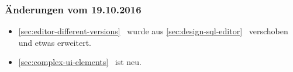 \documentclass[paper=a4,fontsize=12pt,parskip=half,twoside]{scrartcl}
\begin{document}
\subsubsection*{Änderungen vom 19.10.2016}
\begin{itemize}[noitemsep]
\item \ref{sec:editor-different-versions}~ wurde aus \ref{sec:design-sql-editor}~ verschoben und etwas erweitert.
\item \ref{sec:complex-ui-elements}~ ist neu.
\end{itemize}

\newpage
\tableofcontents{}

\cleardoublepage


\cleardoublepage


\cleardoublepage


\cleardoublepage


\cleardoublepage


\cleardoublepage


\appendix{}

\cleardoublepage


\cleardoublepage


\cleardoublepage


\listoftodos[Notes]

\printbibliography
\end{document}
